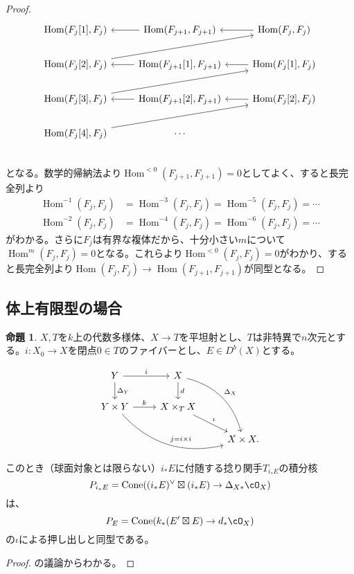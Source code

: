 \documentclass[uplatex, a4paper, dvipdfmx]{jsarticle}
\theoremstyle{definition}
\newtheorem{proposition}[theorem]{命題}
\DeclareMathOperator{\Hom}{\mathrm{Hom}}
\DeclareMathOperator{\Cone}{\mathrm{Cone}}
\begin{document}
\begin{proof}
    \[
        \begin{tikzcd}
            \Hom(F_j[1], F_j) & \Hom(F_{j+1}, F_{j+1}) \ar[l] & \Hom(F_j, F_j) \ar[l] \\
            \Hom(F_j[2], F_j) \ar[rru] & \Hom(F_{j+1}[1], F_{j+1}) \ar[l] & \Hom(F_j[1], F_j) \ar[l] \\
            \Hom(F_j[3], F_j) \ar[rru] & \Hom(F_{j+1}[2], F_{j+1}) \ar[l] & \Hom(F_j[2], F_j) \ar[l] \\
            \Hom(F_j[4], F_j) \ar[rru]& \cdots &\\
        \end{tikzcd}
    \]
    となる。数学的帰納法より$\Hom^{<0}(F_{j+1}, F_{j+1}) = 0$としてよく、すると長完全列より
    \begin{align}
        \Hom^{-1}(F_j, F_j) & = \Hom^{-3}(F_j, F_j) = \Hom^{-5}(F_j, F_j) = \cdots \\
        \Hom^{-2}(F_j, F_j) & = \Hom^{-4}(F_j, F_j) =\Hom^{-6}(F_j, F_j) = \cdots
    \end{align}
    がわかる。さらに$F_j$は有界な複体だから、十分小さい$m$について$\Hom^m(F_j, F_j) = 0$となる。これらより$\Hom^{<0}(F_j, F_j) = 0$がわかり、すると長完全列より$\Hom(F_j, F_j) \to \Hom(F_{j+1}, F_{j+1})$が同型となる。
\end{proof}

\subsection{体上有限型の場合}

\begin{proposition}
    $X, T$を$k$上の代数多様体、$X \to T$を平坦射とし、$T$は非特異で$n$次元とする。$i \colon X_0 \to X$を閉点$0 \in T$のファイバーとし、$E \in D^b(X)$とする。

    \[
        \begin{tikzcd}
            Y \arrow[r,"i"]\arrow[d, "\Delta_Y"] & X \arrow[d,"d"]\arrow[rdd, bend left, "\Delta_X"]&\\
            Y \times Y \arrow[r, "k"]\arrow[rrd, bend right, "j=i \times i"]& X \times_T X\arrow[rd, "\iota"]&\\
            & & X \times X.
        \end{tikzcd}
    \]
    このとき（球面対象とは限らない）$i_*E$に付随する捻り関手$T_{i_*E}$の積分核
    \begin{equation}
        P_{i_*E} = \Cone((i_*E)^\vee \boxtimes (i_*E) \to \Delta_{X*}\cO_X)
    \end{equation}
    は、
    \begin{equation}
        P_{E} = \Cone(k_*(E' \boxtimes E)\to d_*\cO_X)
    \end{equation}
    の$\iota$による押し出しと同型である。
\end{proposition}
\begin{proof}
    \cite{2023arXiv230212501A}の議論からわかる。
\end{proof}
\end{document}
